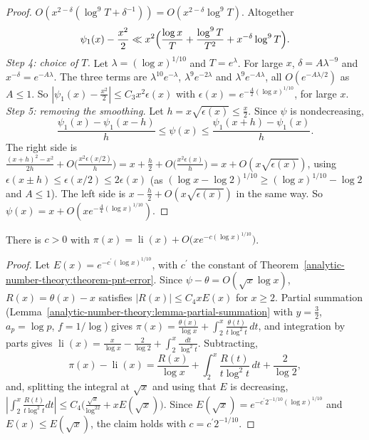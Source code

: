 \begin{proof}
$O(x^{2-\delta}(\log^9T + \delta^{-1})) = O(x^{2-\delta}\log^9T)$. Altogether
\[
\psi_1(x) - \frac{x^2}{2} \ll x^2\Bigl(\frac{\log x}{T} + \frac{\log^9T}{T^2} + x^{-\delta}\log^9T\Bigr).
\]
\emph{Step 4: choice of $T$.} Let $\lambda = (\log x)^{1/10}$ and $T = e^\lambda$. For large $x$, $\delta = A\lambda^{-9}$ and $x^{-\delta} = e^{-A\lambda}$. The three terms are
$\lambda^{10}e^{-\lambda}$, $\lambda^9e^{-2\lambda}$ and $\lambda^9e^{-A\lambda}$, all $O(e^{-A\lambda/2})$ as $A \leq 1$. So $|\psi_1(x) - \frac{x^2}2| \leq C_3x^2\epsilon(x)$ with $\epsilon(x) = e^{-\frac A2(\log x)^{1/10}}$, for large $x$.
\emph{Step 5: removing the smoothing.} Let $h = x\sqrt{\epsilon(x)} \leq \frac x2$. Since $\psi$ is nondecreasing,
\[
\frac{\psi_1(x) - \psi_1(x - h)}{h} \leq \psi(x) \leq \frac{\psi_1(x + h) - \psi_1(x)}{h}.
\]
The right side is $\frac{(x + h)^2 - x^2}{2h} + O\bigl(\frac{x^2\epsilon(x/2)}{h}\bigr) = x + \frac h2 + O\bigl(\frac{x^2\epsilon(x)}{h}\bigr) = x + O(x\sqrt{\epsilon(x)})$, using $\epsilon(x \pm h) \leq \epsilon(x/2) \leq 2\epsilon(x)$
(as $(\log x - \log 2)^{1/10} \geq (\log x)^{1/10} - \log 2$ and $A \leq 1$). The left side is $x - \frac h2 + O(x\sqrt{\epsilon(x)})$ in the same way. So $\psi(x) = x + O(xe^{-\frac A4(\log x)^{1/10}})$.
\end{proof}

\begin{corollary}\label{analytic-number-theory:corollary-pnt-li}
There is $c > 0$ with $\pi(x) = \operatorname{li}(x) + O\bigl(xe^{-c(\log x)^{1/10}}\bigr)$.
\end{corollary}

\begin{proof}
Let $E(x) = e^{-c^{\prime}(\log x)^{1/10}}$, with $c^{\prime}$ the constant of Theorem~\ref{analytic-number-theory:theorem-pnt-error}. Since $\psi - \theta = O(\sqrt{x}\log x)$, $R(x) = \theta(x) - x$ satisfies
$|R(x)| \leq C_4xE(x)$ for $x \geq 2$. Partial summation (Lemma~\ref{analytic-number-theory:lemma-partial-summation} with $y = \frac32$, $a_p = \log p$, $f = 1/\log$) gives
$\pi(x) = \frac{\theta(x)}{\log x} + \int_2^x\frac{\theta(t)}{t\log^2t}\,dt$, and integration by parts gives $\operatorname{li}(x) = \frac{x}{\log x} - \frac{2}{\log 2} + \int_2^x\frac{dt}{\log^2t}$. Subtracting,
\[
\pi(x) - \operatorname{li}(x) = \frac{R(x)}{\log x} + \int_2^x\frac{R(t)}{t\log^2t}\,dt + \frac{2}{\log 2},
\]
and, splitting the integral at $\sqrt{x}$ and using that $E$ is decreasing, $|\int_2^x\frac{R(t)}{t\log^2t}dt| \leq C_4\bigl(\frac{\sqrt{x}}{\log^22} + xE(\sqrt{x})\bigr)$. Since $E(\sqrt{x}) = e^{-c^{\prime}2^{-1/10}(\log x)^{1/10}}$ and $E(x) \leq E(\sqrt{x})$, the claim
holds with $c = c^{\prime}2^{-1/10}$.
\end{proof}

